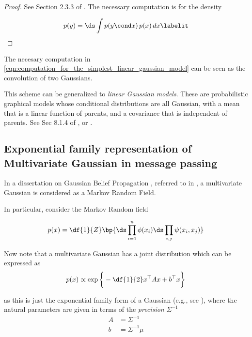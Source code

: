 \documentclass{article} %
\newcommand{\selfpotential}{\phi}
\newcommand{\edgepotential}{\psi}
\begin{document}
\begin{proof}
See Section 2.3.3 of \cite{bishop2006pattern}.    The necessary computation is for the density

\begin{align*}
p(y)  = \ds\int p(y \cond x) \,  p(x) \,  dx
\labelit \label{eqn:computation_for_the_simplest_linear_gaussian_model}
\end{align*}
\end{proof}


\begin{remark}
The necesary computation in \eqref{eqn:computation_for_the_simplest_linear_gaussian_model} can be seen as the convolution of two Gaussians.
\end{remark}


\begin{remark}
This scheme can be generalized to \textit{linear Gaussian models}.  These are probabilistic graphical models whose conditional distributions are all Gaussian,  with a mean that is a linear function of parents,  and a covariance that is independent of parents.   See Sec 8.1.4 of \cite{bishop2006pattern}, or \cite{roweis1999unifying}.   
\end{remark}


 \subsection{Exponential family representation of Multivariate Gaussian in message passing}
 \label{sec:mvn_in_message_passing}
 
In a dissertation on Gaussian Belief Propagation \cite{bickson2008gaussian}, referred to in \cite{krishnan2016structured}, a multivariate Gaussian is considered as a Markov Random Field. 

In particular, consider the Markov Random field

\begin{equation}
p(x) = \df{1}{Z}\bp{ \ds\prod_{i=1}^n \selfpotential(x_i) \ds\prod_{i,j} \edgepotential(x_i, x_j)  } 
\label{eqn:mrf_dyadic}
\end{equation}

Now note that a multivariate Gaussian has a joint distribution which can be expressed as
\[ p(x) \propto \exp \bigg\{ -\df{1}{2} x^\top A x + b^\top x \bigg\} \]

as this is just the exponential family form of a Gaussian (e.g., see  \cite{englehardt2013gaussian}), where the natural parameters are
given in terms of the \textit{precision} $\Sigma^{-1}$
\begin{align*}
A &= \Sigma^{-1} \\
b &= \Sigma^{-1} \mu
\end{align*}
\end{document}
